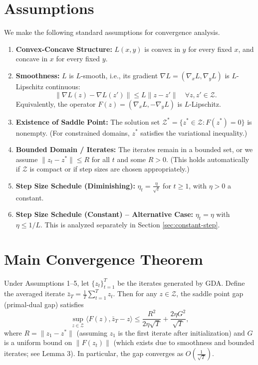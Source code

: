 \documentclass{article}
\begin{document}
\section*{Assumptions}
We make the following standard assumptions for convergence analysis.

\begin{enumerate}
    \item \textbf{Convex-Concave Structure:} $L(x,y)$ is convex in $y$ for every fixed $x$, and concave in $x$ for every fixed $y$.
    \item \textbf{Smoothness:} $L$ is $L$-smooth, i.e., its gradient $\nabla L = (\nabla_x L, \nabla_y L)$ is $L$-Lipschitz continuous:
    \[
    \|\nabla L(z) - \nabla L(z')\| \le L \|z - z'\| \quad \forall z, z' \in \mathcal{Z}.
    \]
    Equivalently, the operator $F(z) = (\nabla_x L, -\nabla_y L)$ is $L$-Lipschitz.
    \item \textbf{Existence of Saddle Point:} The solution set $\mathcal{Z}^* = \{z^* \in \mathcal{Z} : F(z^*) = 0\}$ is nonempty. (For constrained domains, $z^*$ satisfies the variational inequality.)
    \item \textbf{Bounded Domain / Iterates:} The iterates remain in a bounded set, or we assume $\|z_t - z^*\| \le R$ for all $t$ and some $R > 0$. (This holds automatically if $\mathcal{Z}$ is compact or if step sizes are chosen appropriately.)
    \item \textbf{Step Size Schedule (Diminishing):} $\eta_t = \frac{\eta}{\sqrt{t}}$ for $t \ge 1$, with $\eta > 0$ a constant. 
    \item \textbf{Step Size Schedule (Constant) -- Alternative Case:} $\eta_t = \eta$ with $\eta \le 1/L$. This is analyzed separately in Section \ref{sec:constant-step}.
\end{enumerate}

\section*{Main Convergence Theorem}
Under Assumptions 1--5, let $\{z_t\}_{t=1}^T$ be the iterates generated by GDA. Define the averaged iterate $\bar{z}_T = \frac{1}{T}\sum_{t=1}^T z_t$. Then for any $z \in \mathcal{Z}$, the saddle point gap (primal-dual gap) satisfies
\[
\sup_{z \in \mathcal{Z}} \langle F(z), \bar{z}_T - z \rangle \le \frac{R^2}{2\eta\sqrt{T}} + \frac{2\eta G^2}{\sqrt{T}},
\]
where $R = \|z_1 - z^*\|$ (assuming $z_1$ is the first iterate after initialization) and $G$ is a uniform bound on $\|F(z_t)\|$ (which exists due to smoothness and bounded iterates; see Lemma 3). In particular, the gap converges as $O\left(\frac{1}{\sqrt{T}}\right)$.
\end{document}
